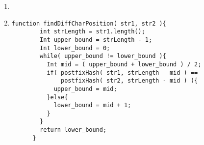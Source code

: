 \documentclass[fleqn,a4paper,12pt]{article}
\begin{document}
\begin{enumerate}
  \item
    \ \\

  \item
    \begin{lstlisting}[frame = single, basicstyle=\linespread{0.8}\SmallFont]
      function findDiffCharPosition( str1, str2 ){     
        int strLength = str1.length();
        Int upper_bound = strLength - 1;
        Int lower_bound = 0;
        while( upper_bound != lower_bound ){
          Int mid = ( upper_bound + lower_bound ) / 2;
          if( postfixHash( str1, strLength - mid ) == 
              postfixHash( str2, strLength - mid ) ){
            upper_bound = mid;
          }else{
            lower_bound = mid + 1;
          }
        }
        return lower_bound;
      }
    \end{lstlisting}
  \end{enumerate}
\end{document}
